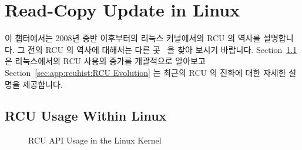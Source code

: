
\chapter{Read-Copy Update in Linux}
\label{app:rcuhist:Read-Copy Update in Linux}

이 챕터에서는 2008년 중반 이후부터의 리눅스 커널에서의 RCU 의 역사를
설명합니다.
그 전의 RCU 의 역사에 대해서는 다른
곳~\cite{PaulEdwardMcKenneyPhD,PaulEMcKenney2008RCUOSR} 을 찾아 보시기
바랍니다.
Section~\ref{sec:app:rcuhist:RCU Usage Within Linux}
은 리눅스에서의 RCU 사용의 증가를 개괄적으로 알아보고
Section~\ref{sec:app:rcuhist:RCU Evolution}
는 최근의 RCU 의 진화에 대한 자세한 설명을 제공합니다.

\section{RCU Usage Within Linux}
\label{sec:app:rcuhist:RCU Usage Within Linux}

\begin{figure}[bp]
\centering
{}
\caption{RCU API Usage in the Linux Kernel}
\label{fig:app:rcuhist:RCU API Usage in the Linux Kernel}
\end{figure}

